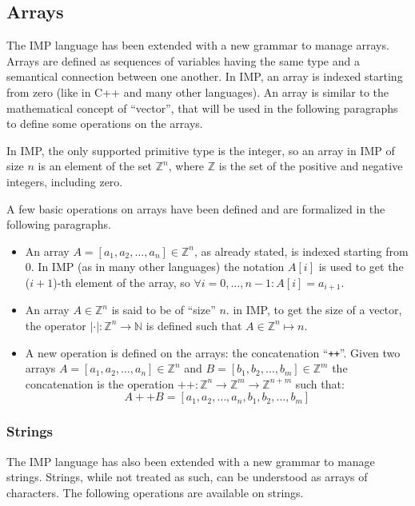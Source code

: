 \documentclass{esposito-documentation}
\begin{document}
\subsection{Arrays}

The IMP language has been extended with a new grammar to manage arrays. Arrays
are defined as sequences of variables having the same type and a semantical
connection between one another. In IMP, an array is indexed starting from zero
(like in C++ \cite{Stroustrup2013} and many other languages). An array is
similar to the mathematical concept of ``vector'', that will be used in the
following paragraphs to define some operations on the arrays.

In IMP, the only supported primitive type is the integer, so an array in IMP of
size $n$ is an element of the set $\mathbb{Z}^n$, where $\mathbb{Z}$ is the set
of the positive and negative integers, including zero.

A few basic operations on arrays have been defined and are formalized in the
following paragraphs.

\begin{itemize}
	\item An array $A=\left[a_1,a_2,\ldots,a_n\right]\in\mathbb{Z}^n$, as
		already stated, is indexed starting from 0. In IMP (as in many other
		languages) the notation $A[i]$ is used to get the ($i+1$)-th element of
		the array, so $\forall i=0,\ldots,n-1: A[i]=a_{i+1}$. 
	\item An array $A\in\mathbb{Z}^n$ is said to be of ``size'' $n$. in IMP, to
		get the size of a vector, the operator
		$|\cdot|:\mathbb{Z}^n\to\mathbb{N}$ is defined such that
		$A\in\mathbb{Z}^n\mapsto n$.
	\item A new operation is defined on the arrays: the concatenation
		``\texttt{++}''.  Given two arrays $A=\left[ a_1,a_2,\ldots,a_n \right]
		\in\mathbb{Z}^n$ and $B=\left[ b_1,b_2,\ldots,b_m\right]
		\in\mathbb{Z}^m$ the concatenation is the operation
		$++:\mathbb{Z}^n\to\mathbb{Z}^m\to\mathbb{Z}^{n+m}$ such that:
		\[A++B=\left[ a_1, a_2, \ldots, a_n, b_1, b_2, \ldots, b_m \right]\]
\end{itemize}

\subsubsection{Strings}

The IMP language has also been extended with a new grammar to manage strings.
Strings, while not treated as such, can be understood as arrays of characters.
The following operations are available on strings.
\end{document}

